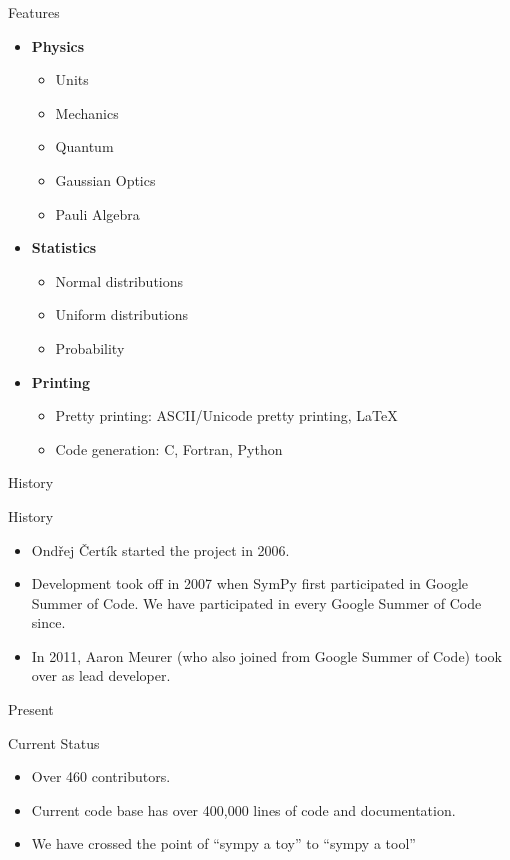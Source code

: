 \documentclass[xcolor=svgnames]{beamer}
\begin{document}
\begin{frame}{Features}
\begin{multicols}{2}
\begin{itemize}
      \item \textbf{Physics}
        \begin{itemize}
          \tiny
        \item Units
        \item Mechanics
        \item Quantum
        \item Gaussian Optics
        \item Pauli Algebra
        \end{itemize}

      \item \textbf{Statistics}
        \begin{itemize}
          \tiny
        \item Normal distributions
        \item Uniform distributions
        \item Probability
        \end{itemize}

      \item \textbf{Printing}
        \begin{itemize}
          \tiny
        \item Pretty printing: ASCII/Unicode pretty printing, LaTeX
        \item Code generation: C, Fortran, Python
        \end{itemize}
      \end{itemize}
    \end{multicols}
  \end{frame}

  \begin{frame}{History}
    \begin{block}{History}
      \begin{itemize}
      \item Ondřej Čertík started the project in 2006.
      \item Development took off in 2007 when SymPy first participated in Google
        Summer of Code. We have participated in every Google Summer of Code since.
      \item In 2011, Aaron Meurer (who also joined from Google Summer of Code) took
        over as lead developer.
      \end{itemize}
    \end{block}
  \end{frame}

  \begin{frame}{Present}
    \begin{block}{Current Status}
      \begin{itemize}
      \item Over 460 contributors.
      \item Current code base has over 400,000 lines of code and documentation.
      \item We have crossed the point of ``sympy a toy'' to ``sympy a tool''
      \end{itemize}
    \end{block}
  \end{frame}
\end{document}
